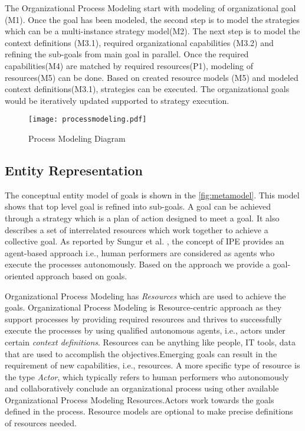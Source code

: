  The Organizational Process Modeling start with modeling of organizational goal (M1). Once the goal has been modeled, the second step is to model the strategies which can be a multi-instance strategy model(M2). The next step is to model the context definitions (M3.1), required organizational capabilities (M3.2) and refining the sub-goals from main goal in parallel. Once the required capabilities(M4) are matched by required resources(P1), modeling of resources(M5) can be done.  Based on created resource models (M5) and modeled context definitions(M3.1), strategies can be executed. The organizational goals would be iteratively updated supported to strategy execution.  


\begin{figure}
	\centering
	\texttt{[image: processmodeling.pdf]}
	\caption{Process Modeling Diagram}
	\label{fig:processdiagram}
\end{figure}

\subsection{Entity Representation}

 The conceptual entity model of goals is shown in the \ref{fig:metamodel}. This model shows that top level goal is refined into sub-goals. A goal can be achieved through a strategy which is a plan of action designed to meet a goal. It also describes a set of interrelated resources which work together to achieve a collective goal. As reported by Sungur et al. \cite{Sungur2014a}, the concept of IPE provides an agent-based approach i.e., human performers are considered as agents who execute the processes autonomously. Based on the approach \cite{Sungur2014a} we provide a goal-oriented approach based on goals.

 Organizational Process Modeling  has \textit{Resources} which are used to achieve the goals. Organizational Process Modeling is Resource-centric approach as they support processes by providing required resources and thrives to successfully execute the processes by using qualified autonomous agents, i.e., actors under certain \textit{context definitions}.  Resources can be anything like people, IT tools, data that are used to accomplish the objectives.Emerging goals can result in the requirement of new capabilities, i.e., resources. A more specific type of resource is the type \textit{Actor}, which typically refers to human performers who autonomously and collaboratively conclude an organizational process using other available Organizational Process Modeling Resources.Actors work towards the goals defined in the process. Resource models are optional to make precise definitions of resources needed.

